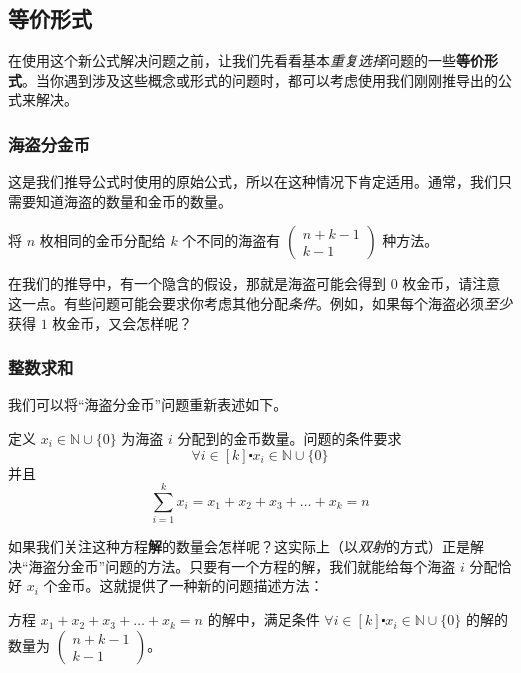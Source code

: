 
\subsection{等价形式}

在使用这个新公式解决问题之前，让我们先看看基本\emph{重复选择}问题的一些\textbf{等价形式}。当你遇到涉及这些概念或形式的问题时，都可以考虑使用我们刚刚推导出的公式来解决。

\subsubsection*{海盗分金币}

这是我们推导公式时使用的原始公式，所以在这种情况下肯定适用。通常，我们只需要知道海盗的数量和金币的数量。

\begin{tcolorbox}[colback=blue!10,
    colframe=blue,
    width=\textwidth,
    arc=2mm, auto outer arc,
    breakable,enhanced jigsaw,
    before upper={\parindent15pt\noindent},	]
    将 $n$ 枚相同的金币分配给 $k$ 个不同的海盗有 $\begin{pmatrix}
        n+k-1\\k-1
    \end{pmatrix}$ 种方法。
\end{tcolorbox}

在我们的推导中，有一个隐含的假设，那就是海盗可能会得到 $0$ 枚金币，请注意这一点。有些问题可能会要求你考虑其他分配\emph{条件}。例如，如果每个海盗必须\emph{至少}获得 $1$ 枚金币，又会怎样呢？

\subsubsection*{整数求和}

我们可以将``海盗分金币''问题重新表述如下。

定义 $x_i \in \mathbb{N} \cup \{0\}$ 为海盗 $i$ 分配到的金币数量。问题的条件要求
\[\forall i \in [k] \centerdot x_i \in \mathbb{N} \cup \{0\}\]
并且
\[\sum_{i=1}^{k}x_i = x_1 + x_2 + x_3 + \dots + x_k = n\]

如果我们关注这种方程\textbf{解}的数量会怎样呢？这实际上（以\emph{双射}的方式）正是解决``海盗分金币''问题的方法。只要有一个方程的解，我们就能给每个海盗 $i$ 分配恰好 $x_i$ 个金币。这就提供了一种新的问题描述方法：

\begin{tcolorbox}[colback=blue!10,
    colframe=blue,
    width=\textwidth,
    arc=2mm, auto outer arc,
    breakable,enhanced jigsaw,
    before upper={\parindent15pt\noindent},	]
    方程 $x_1 + x_2 + x_3 + \dots + x_k = n$ 的解中，满足条件 $\forall i \in [k] \centerdot x_i \in \mathbb{N} \cup \{0\}$ 的解的数量为 $\begin{pmatrix}
        n+k-1\\k-1
    \end{pmatrix}$。
\end{tcolorbox}

